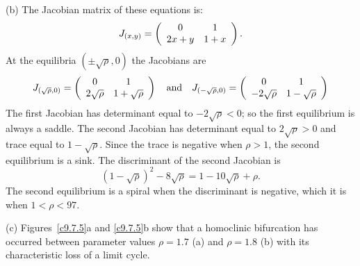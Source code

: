 \documentclass{ximera}
\begin{document}
\begin{exercise}
\begin{solution}
(b)  The Jacobian matrix of these equations is:
\[
J_{(x,y)} = \left(\begin{array}{cc} 0 & 1\\ 2x+y &1+x\end{array}\right).
\]
At the equilibria $(\pm\sqrt{\rho},0)$ the Jacobians are
\[
J_{(\sqrt{\rho},0)}= \left(\begin{array}{cc} 0 & 1\\ 2\sqrt{\rho} &1+\sqrt{\rho}\end{array}\right) 
\quad\mbox{and}\quad
J_{(-\sqrt{\rho},0)}= \left(\begin{array}{cc} 0 & 1\\ -2\sqrt{\rho} &1-\sqrt{\rho}\end{array}\right)
\]
The first Jacobian has determinant equal to $-2\sqrt{\rho}<0$; so the
first equilibrium is always a saddle.  The second Jacobian has determinant
equal to $2\sqrt{\rho}>0$ and trace equal to $1-\sqrt{\rho}$.  Since the
trace is negative when $\rho>1$, the second equilibrium is a sink.  The
discriminant of the second Jacobian is 
\[
(1-\sqrt{\rho})^2-8\sqrt{\rho}=1-10\sqrt{\rho}+\rho.
\]
The second equilibrium is a spiral when the discriminant is negative, which
it is when $1<\rho<97$.

(c)  Figures~\ref{c9.7.5}a and \ref{c9.7.5}b show that a homoclinic 
bifurcation has occurred between parameter values $\rho=1.7$ (a) and 
$\rho=1.8$ (b) with its characteristic loss of a limit cycle. 

\begin{figure}[htb]
                       \centerline{%
                       }
\end{figure}

\end{solution}
\end{exercise}
\end{document}
